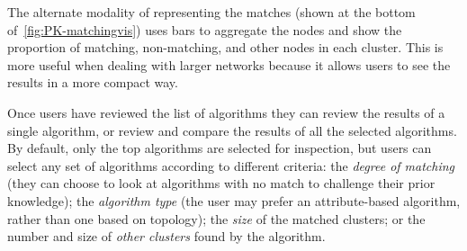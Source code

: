 The alternate modality of representing the matches (shown at the bottom of~\autoref{fig:PK-matchingvis}) uses bars to aggregate the nodes and show the proportion of matching, non-matching, and other nodes in each cluster. This is more useful when dealing with larger networks because it allows users to see the results in a more compact way.







Once users have reviewed the list of algorithms they can review the results of a single algorithm, or review and compare the results of all the selected algorithms.
By default, only the top algorithms are selected for inspection, but users can select any set of algorithms according to different criteria:
the \textit{degree of matching} (\ie they can choose to look at algorithms with no match to challenge their prior knowledge);
the \textit{algorithm type} (the user may prefer an attribute-based algorithm, rather than one based on topology);
the \textit{size} of the matched clusters;
or the number and size of \textit{other clusters} found by the algorithm.

